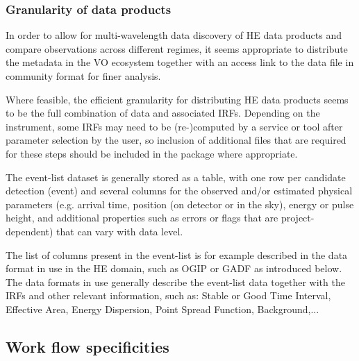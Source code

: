 \documentclass[11pt,a4paper]{ivoa}
\begin{document}
\subsubsection{Granularity of data products}

In order to allow for multi-wavelength data discovery of HE data products and compare observations across different regimes, it seems appropriate to distribute the metadata in the VO ecosystem together with an access link to the data file in community format for finer analysis.

Where feasible, the efficient granularity for distributing HE data products seems to be the full combination of data and associated IRFs. Depending on the instrument, some IRFs may need to be (re-)computed by a service or tool after parameter selection by the user, so inclusion of additional files that are required for these steps should be included in the package where appropriate.


The event-list dataset is generally stored as a table, with one row per candidate detection (event) and several columns for the observed and/or estimated physical parameters (e.g. arrival time, position (on detector or in the sky), energy or pulse height, and additional properties such as errors or flags that are project-dependent) that can vary with data level.

The list of columns present in the event-list is for example described in the data format in use in the HE domain, such as OGIP or GADF as introduced below. The data formats in use generally describe the event-list data together with the IRFs and other relevant information, such as: Stable or Good Time Interval, Effective Area, Energy Dispersion, Point Spread Function, Background,...



\subsection{Work flow specificities}
\end{document}
